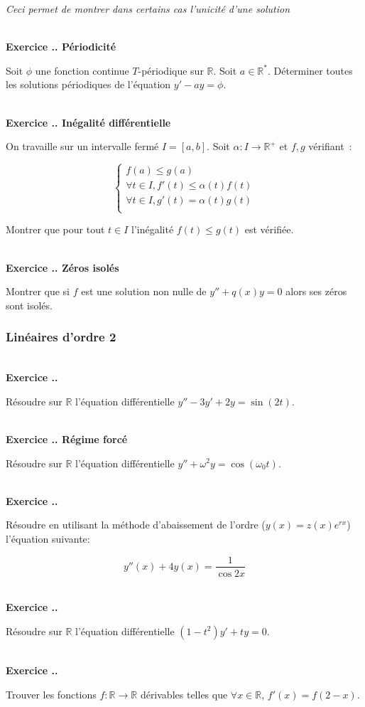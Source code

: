 \documentclass{article}
\newcommand{\mb}[1]{\mathbb{#1}}
\newcounter{exo}
\newcommand{\exercice}[1][\null]{\textbf{\\ Exercice \thesection.\theexo. #1} \addtocounter{exo}{1}}
\begin{document}
\emph{Ceci permet de montrer dans certains cas l'unicité d'une solution}


\exercice[Périodicité]
Soit $\phi$ une fonction continue $T$-périodique sur $\mb{R}$.
Soit $a \in \mb{R}^*$. Déterminer toutes les solutions périodiques 
de l'équation $y' - ay = \phi$.

\exercice[Inégalité différentielle]

On travaille sur un intervalle fermé $I = [a,b]$.
Soit $\alpha : I \to \mb{R}^+$ et $f,g$ vérifiant~:

\begin{equation*}
    \begin{cases}
        f(a) \leq g(a) \\
        \forall t \in I, f'(t) \leq \alpha (t) f(t) \\
        \forall t \in I, g'(t)  = \alpha (t) g(t) \\
    \end{cases}
\end{equation*}

Montrer que pour tout $t \in I$ l'inégalité $f(t) \leq g(t)$ est vérifiée.

\exercice[Zéros isolés]

Montrer que si $f$ est une solution non nulle de $y'' + q(x) y = 0$
alors ses zéros sont isolés. 


\subsubsection{Linéaires d'ordre 2}

\exercice

Résoudre sur $\mb{R}$ l'équation différentielle $y'' - 3y' + 2y = \sin(2t)$.

\exercice[Régime forcé]

Résoudre sur $\mb{R}$ l'équation différentielle $y'' + \omega^2 y = \cos(\omega_0 t)$.

\exercice 

Résoudre en utilisant la méthode d'abaissement 
de l'ordre ($y(x) = z(x) e^{r x}$) l'équation
suivante:

\begin{equation*}
    y''(x) + 4y(x) = \frac{1}{\cos 2x }
\end{equation*}

\exercice

Résoudre sur $\mb{R}$ l'équation différentielle  $(1-t^2)y' + t y = 0$.


\exercice
Trouver les fonctions $f : \mb{R} \rightarrow \mb{R}$ dérivables telles que $\forall x \in \mb{R}$, $f'(x) = f(2-x)$.
\end{document}
